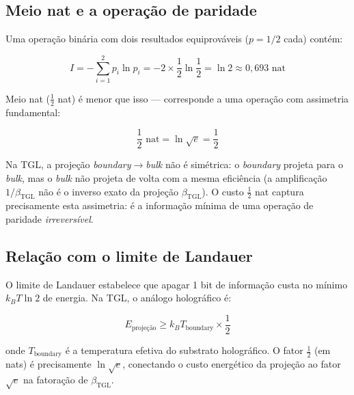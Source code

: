 \documentclass[12pt,a4paper,twoside]{article}
\newcommand{\betatgl}{\beta_{\!\scriptscriptstyle\mathrm{TGL}}}
\newcommand{\boundary}{\textit{boundary}}
\newcommand{\bulk}{\textit{bulk}}
\begin{document}
\subsection{Meio nat e a operação de paridade}

Uma operação binária com dois resultados equiprováveis ($p = 1/2$ cada) contém:

\begin{equation}
I = -\sum_{i=1}^{2} p_i \ln p_i = -2 \times \frac{1}{2} \ln \frac{1}{2} = \ln 2 \approx 0{,}693 \text{ nat}
\end{equation}

Meio nat ($\frac{1}{2}$ nat) é menor que isso --- corresponde a uma operação com assimetria fundamental:

\begin{equation}
\frac{1}{2} \text{ nat} = \ln \sqrt{e} = \frac{1}{2}
\end{equation}

Na TGL, a projeção \boundary$\to$\bulk{} não é simétrica: o \boundary{} projeta para o \bulk{}, mas o \bulk{} não projeta de volta com a mesma eficiência (a amplificação $1/\betatgl$ não é o inverso exato da projeção $\betatgl$). O custo $\frac{1}{2}$ nat captura precisamente esta assimetria: é a informação mínima de uma operação de paridade \textit{irreversível}.

\subsection{Relação com o limite de Landauer}

O limite de Landauer \cite{Landauer1961} estabelece que apagar 1 bit de informação custa no mínimo $k_B T \ln 2$ de energia. Na TGL, o análogo holográfico é:

\begin{equation}
E_{\text{projeção}} \geq k_B T_{\text{boundary}} \times \frac{1}{2}
\end{equation}

\noindent onde $T_{\text{boundary}}$ é a temperatura efetiva do substrato holográfico. O fator $\frac{1}{2}$ (em nats) é precisamente $\ln\sqrt{e}$, conectando o custo energético da projeção ao fator $\sqrt{e}$ na fatoração de $\betatgl$.


\end{document}
